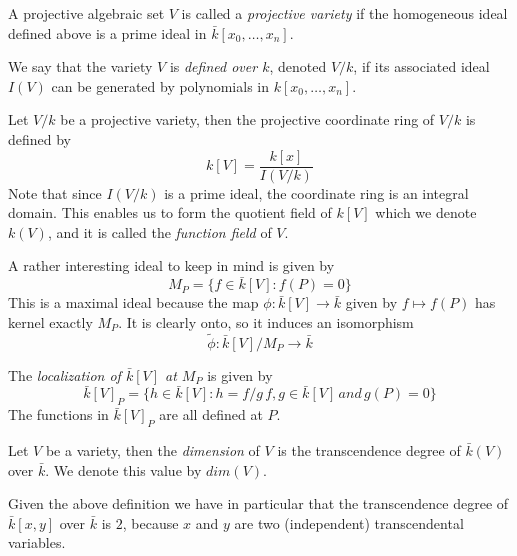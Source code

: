\begin{mydef}
 A projective algebraic set $V$ is called a \emph{projective variety} if the homogeneous
ideal defined above is a prime ideal in $\bar{k}[x_0,\ldots,x_n]$.
\end{mydef}

We say that the variety $V$ is \emph{defined over $k$}, denoted $V/k$, if its associated ideal $I(V)$
can be generated by polynomials in $k[x_0,\ldots,x_n]$.

\begin{mydef}
 Let $V/k$ be a projective variety, then the projective coordinate ring of $V/k$ is defined by
$$ k[V] = \frac{k[x]}{I(V/k)}$$
Note that since $I(V/k)$ is a prime ideal, the coordinate ring is an integral domain.
This enables us to form the quotient field of $k[V]$ which we denote $k(V)$, and it is called
the \emph{function field} of $V$.
\end{mydef}

A rather interesting ideal to keep in mind is given by
$$ M_P = \{ f\in \bar{k}[V] : f(P)=0 \} $$
This is a maximal ideal because the map $\phi: \bar{k}[V] \rightarrow \bar{k}$ given by
$ f \mapsto f(P) $ has kernel exactly $M_P$. It is clearly onto, so it induces an
isomorphism $$\tilde{\phi}: \bar{k}[V]/M_P \rightarrow \bar{k} $$

\begin{mydef}
 The \emph{localization of $\bar{k}[V]$ at $M_P$} is given by
$$ \bar{k}[V]_P = \{ h \in \bar{k}[V] : h = f/g\, f,g\in \bar{k}[V]\, and\, g(P)=0 \} $$
The functions in $\bar{k}[V]_P$ are all defined at $P$.
\end{mydef}


\begin{mydef}
 Let $V$ be a variety, then the \emph{dimension} of $V$ is the transcendence degree of $\bar{k}(V)$ over
$\bar{k}$. We denote this value by $dim(V)$.
\end{mydef}

Given the above definition we have in particular that the transcendence degree of $\bar{k}[x,y]$ over
$\bar{k}$ is $2$, because $x$ and $y$ are two (independent) transcendental variables.

